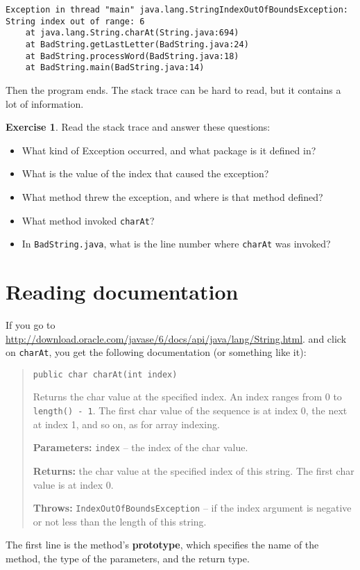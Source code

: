 \documentclass[12pt]{book}
\theoremstyle{definition}
\newtheorem{excz}{Exercise}[chapter]
\newenvironment{exercise}{\bigskip\begin{excz}\mbox{}}{\end{excz}}
\begin{document}
\begin{lstlisting}
Exception in thread "main" java.lang.StringIndexOutOfBoundsException:
String index out of range: 6
	at java.lang.String.charAt(String.java:694)
	at BadString.getLastLetter(BadString.java:24)
	at BadString.processWord(BadString.java:18)
	at BadString.main(BadString.java:14)
\end{lstlisting}

Then the program ends.
The stack trace can be hard to read, but it contains a lot of information.

\begin{exercise}
Read the stack trace and answer these questions:

\begin{itemize}

\item What kind of Exception occurred, and what package is it defined
in?

\item What is the value of the index that caused the exception?

\item What method threw the exception, and where is
that method defined?

\item What method invoked {\tt charAt}?

\item In {\tt BadString.java}, what is the line number where {\tt charAt}
was invoked?

\end{itemize}

\end{exercise}


\section{Reading documentation}
\label{documentation}

If you go to
\url{http://download.oracle.com/javase/6/docs/api/java/lang/String.html}.
and click on {\tt charAt}, you get the following documentation
(or something like it):

\begin{quote}
\begin{lstlisting}
public char charAt(int index)
\end{lstlisting}

Returns the char value at the specified index. An index ranges from 0
to \verb+length() - 1+. The first char value of the sequence is at index 0,
the next at index 1, and so on, as for array indexing.

\textbf{Parameters:} \texttt{index} -- the index of the char value.

\textbf{Returns:} the char value at the specified index of this string. The
  first char value is at index 0.

\textbf{Throws:} \texttt{IndexOutOfBoundsException} -- if the index argument is negative
  or not less than the length of this string.
\end{quote}
%
The first line is the method's {\bf prototype}, which specifies the
name of the method, the type of the parameters, and the return type.
\end{document}
